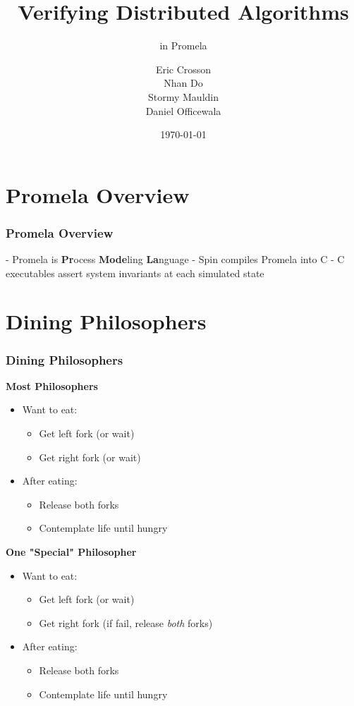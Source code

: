 \documentclass[t, pdftex]{beamer}
\title{Verifying Distributed Algorithms}
\subtitle{in Promela}
\author{Eric Crosson \\ Nhan Do \\ Stormy Mauldin \\ Daniel Officewala}
\institute{EE 360P}
\date{\today}
\begin{document}
\titleframe



\section{Promela Overview}
\begin{frame}
    \frametitle{Promela Overview}
    - Promela is \textbf{Pr}ocess \textbf{Mode}ling \textbf{La}nguage
    - Spin compiles Promela into C
    - C executables assert system invariants at each simulated state
\end{frame}

\section{Dining Philosophers}
\begin{frame}[c]
  \frametitle{Dining Philosophers}
  \begin{multicols}{2}
    \textbf{Most Philosophers}
    \begin{itemize}
      \item Want to eat:
      \begin{itemize}
        \item Get left fork (or wait)
        \item Get right fork (or wait)
      \end{itemize}
      \item After eating:
      \begin{itemize}
        \item Release both forks
        \item Contemplate life until hungry
      \end{itemize}
    \end{itemize}
    \columnbreak
    \textbf{One "Special" Philosopher}
    \begin{itemize}
      \item Want to eat:
      \begin{itemize}
        \item Get left fork (or wait)
        \item Get right fork (if fail, release \textit{both} forks)
      \end{itemize}
      \item After eating:
      \begin{itemize}
        \item Release both forks
        \item Contemplate life until hungry
      \end{itemize}
    \end{itemize}
  \end{multicols}
\end{frame}
\end{document}
